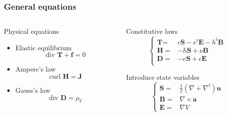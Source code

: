 \documentclass[compress]{beamer}
\begin{document}
\begin{frame}\frametitle{General equations}
\begin{columns}[totalwidth=\textwidth] 
   \begin{column}{.5\textwidth}
   \begin{exampleblock}{Physical equations} 
   \begin{itemize}[label=$\bullet$, font=\small, leftmargin=*]
	\item Elastic equilibrium 
	\begin{equation*}
	\text{div }\boldsymbol{T} + \boldsymbol{f} = 0
	\end{equation*}
	\item Ampere's law
	\begin{equation*}
	\text{curl }\boldsymbol{H} = \boldsymbol{J}
	\end{equation*}
	\item Gauss's law
	\begin{equation*}
	\text{div }\boldsymbol{D} = \rho_V
	\end{equation*}
	\end{itemize}
	\end{exampleblock}	
	\end{column}
	\begin{column}{.45\textwidth}
	\begin{exampleblock}{Constitutive laws} \vspace*{-\baselineskip}
	\begin{equation*}
				\left\{ 
				\begin{aligned}
				\textbf{T} = & c \boldsymbol{S} - e^t \boldsymbol{E} - h^t \boldsymbol{B} \\
				\boldsymbol{H} = & - h \boldsymbol{S} + \nu \boldsymbol{B} \\
				\boldsymbol{D} = & - e \boldsymbol{S} +  \epsilon \boldsymbol{E}  \\
        		\end{aligned}
				\right.
	\end{equation*}
	\end{exampleblock}
	\begin{exampleblock}{Introduce state variables}
	\begin{equation*} 
			\left\{
			\begin{aligned}
		        \boldsymbol{S} = & \frac{1}{2} (\nabla + \nabla^t) \boldsymbol{u} \\
		        \boldsymbol{B} = & \nabla \times \boldsymbol{a} \\
        			\boldsymbol{E} = &  \nabla V
        	\end{aligned}
			\right.
			\end{equation*}
	\end{exampleblock}
	\end{column}
\end{columns}
\end{frame}
\end{document}
